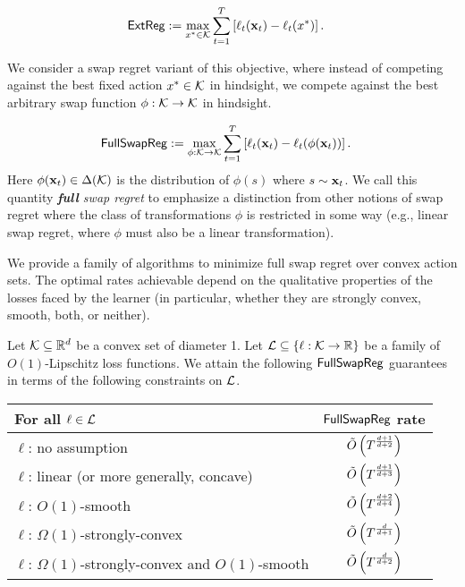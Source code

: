 \documentclass[final,12pt]{alt2025}
\begin{document}
\begin{align*}
    \operatorname{\mathsf{ExtReg}} &:= \max_{x^* \in\mathcal{K}} \sum_{t=1}^T \left[\ell_t(\mathbf{x}_t) - \ell_t(x^*)\right].
\end{align*}

We consider a swap regret variant of this objective, where instead of competing against the best fixed action $x^* \in \mathcal{K}$ in hindsight, we compete against the best arbitrary swap function $\phi: \mathcal{K} \rightarrow \mathcal{K}$ in hindsight.

\begin{align*}
    \mathsf{FullSwapReg} &:= \max_{\phi:\mathcal{K} \rightarrow \mathcal{K}} \sum_{t=1}^T \left[\ell_t(\mathbf{x}_t) - \ell_t(\phi(\mathbf{x}_t))\right].
\end{align*}
Here $\phi(\mathbf{x}_t) \in \Delta(\mathcal{K})$ is the distribution of $\phi(s)$ where $s \sim \mathbf{x}_t$. We call this quantity \emph{\textbf{full} swap regret} to emphasize a distinction from other notions of swap regret where the class of transformations $\phi$ is restricted in some way (e.g., linear swap regret, where $\phi$ must also be a linear transformation).  

We provide a family of algorithms to minimize full swap regret over convex action sets. The optimal rates achievable depend on the qualitative properties of the losses faced by the learner (in particular, whether they are strongly convex, smooth, both, or neither).

\begin{theorem}\label{thm:informal_summary}
    Let $\mathcal{K} \subseteq \mathbb{R}^d$ be a convex set of diameter 1.  Let $\mathcal{L} \subseteq \left\{\ell: \mathcal{K} \to \mathbb{R}\right\}$ be a family of $O(1)$-Lipschitz loss functions.  
    We attain the following $\mathsf{FullSwapReg}$ guarantees in terms of the following constraints on $\mathcal{L}$.
    \begin{center}
        \begin{tabular}{l|c}
            For all $\ell \in \mathcal{L}$ & $\mathsf{FullSwapReg}$ rate\\
            \hline 
            $\ell$: no assumption
            & $\tilde{O}\left(T^{\frac{d+1}{d+2}}\right)$\\
            \hline 
            $\ell$: linear (or more generally, concave)
            & $\tilde{O}\left(T^{\frac{d+1}{d+3}}\right)$\\
            \hline 
            $\ell$: $O(1)$-smooth
            & $\tilde{O}\left(T^{\frac{d+2}{d+4}}\right)$\\
            \hline 
            $\ell$: $\Omega(1)$-strongly-convex
            & $\tilde{O}\left(T^{\frac{d}{d+1}}\right)$\\
            \hline 
            $\ell$: $\Omega(1)$-strongly-convex and $O(1)$-smooth
            & $\tilde{O}\left(T^{\frac{d}{d+2}}\right)$\\
        \end{tabular}
    \end{center}
\end{theorem}
\end{document}
